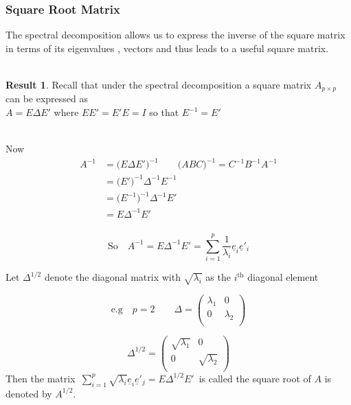 \documentclass[11pt,a4paper]{article}
\theoremstyle{definition}
\newtheorem{result}[thm]{Result}
\begin{document}
\subsubsection{Square Root Matrix}
The spectral decomposition allows us to express the inverse of the square matrix in terms of its eigenvalues , vectors and thus leads to a useful square matrix.\\\\



\begin{result}
Recall that under the spectral decomposition a square matrix $A_{p\times p}$ can be expressed as\\ $A = E\Delta E'$ where $EE' = E'E = I$ so that $E^{-1} = E'$\\\\
\end{result}
 
 
Now
\begin{align*}
A^{-1} & = \big(E\Delta E'\big)^{-1}\qquad   \big(ABC\big)^{-1} = C^{-1}B^{-1}A^{-1}\\
       & = \big(E'\big)^{-1}\Delta^{-1} E^{-1}\\
       & = \big(E^{-1}\big)^{-1}\Delta^{-1}E'\\
       & = E\Delta^{-1}E'\\
\end{align*} 


\begin{equation}\tag{1}
\text{So}\quad  A^{-1} = E\Delta^{-1} E' = \sum^p_{i=1} \frac{1}{\lambda_i}\underline{e}_i\underline{e}'_i
\end{equation}


Let $\Delta^{1/2}$ denote the diagonal matrix with $\sqrt{\lambda_i}$ as the $i^{\text{th}}$ diagonal element

$$\text{e.g}\quad  p=2\qquad  \Delta = \begin{pmatrix}
\lambda_1 & 0 \\
0 & \lambda_2\\
\end{pmatrix}$$

$$\Delta^{1/2} = \begin{pmatrix}
\sqrt{\lambda_1} & 0\\
0 & \sqrt{\lambda_2}\\
\end{pmatrix}$$
Then the matrix
\,$\displaystyle{\sum^p_{i=1}\sqrt{\lambda_i}\underline{e}_i\underline{e}'_j = E \Delta^{1/2}E'}\,$ is called the square root of $A$ is denoted by $A^{1/2}$.\\\\
\end{document}
